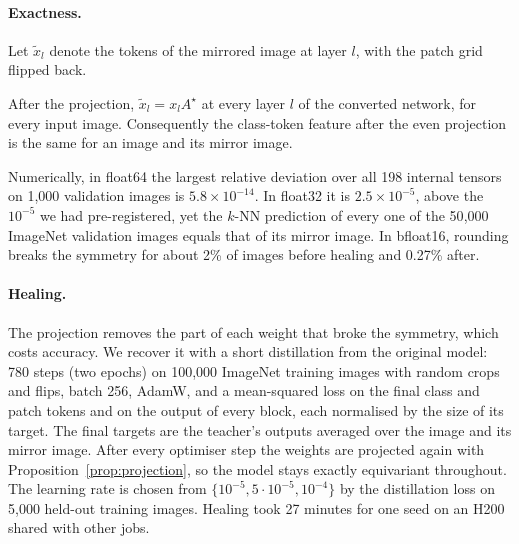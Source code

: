 \paragraph{Exactness.}
Let $\tilde{x}_l$ denote the tokens of the mirrored image at layer $l$, with the patch grid flipped back.

\begin{proposition}\label{prop:exact}
After the projection, $\tilde{x}_l = x_l A^\star$ at every layer $l$ of the converted network, for every input image.
Consequently the class-token feature after the even projection is the same for an image and its mirror image.
\end{proposition}

Numerically, in float64 the largest relative deviation over all 198 internal tensors on 1{,}000 validation images is
$5.8\times10^{-14}$. In float32 it is $2.5\times10^{-5}$, above the $10^{-5}$ we had pre-registered, yet the $k$-NN
prediction of every one of the 50{,}000 ImageNet validation images equals that of its mirror image. In bfloat16,
rounding breaks the symmetry for about 2\% of images before healing and 0.27\% after.

\paragraph{Healing.}
The projection removes the part of each weight that broke the symmetry, which costs accuracy. We recover it with a short
distillation from the original model: 780 steps (two epochs) on 100{,}000 ImageNet training images with random crops and
flips, batch 256, AdamW, and a mean-squared loss on the final class and patch tokens and on the output of every block,
each normalised by the size of its target. The final targets are the teacher's outputs averaged over the image and its
mirror image. After every optimiser step the weights are projected again with Proposition~\ref{prop:projection}, so the
model stays exactly equivariant throughout. The learning rate is chosen from $\{10^{-5}, 5\cdot10^{-5}, 10^{-4}\}$ by the
distillation loss on 5{,}000 held-out training images. Healing took 27 minutes for one seed on an H200 shared with other
jobs.
